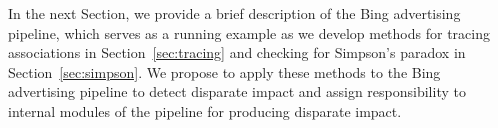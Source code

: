 \documentclass[10pt, onecolumn]{report}
\begin{document}
In the next Section, we provide a brief description of the Bing advertising 
pipeline, which serves as a running example as we develop methods
for tracing associations in Section~\ref{sec:tracing} 
and checking for Simpson's paradox in Section~\ref{sec:simpson}. 
We propose to apply these methods to the Bing advertising pipeline to detect
disparate impact and assign responsibility to internal modules
of the pipeline for producing disparate impact. 





\end{document}
